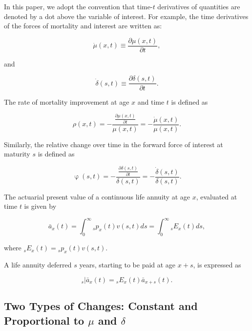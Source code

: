 \documentclass[12pt]{article}
\begin{document}
In this paper, we adopt the convention that time-$t$ derivatives of quantities are denoted by a dot above the variable of interest. For example, the time derivatives of the forces of mortality and interest are written as:


\begin{equation} \label{eq:mudot}
\dot{\mu}(x,t)\equiv\frac{\partial\mu(x,t)}{\partial t},
\end{equation}

and 

\begin{equation} \label{eq:deltadot}
\dot{\delta}(s,t)\equiv\frac{\partial\delta(s,t)}{\partial t}.
\end{equation}

The rate of mortality improvement at age \(x\) and time $t$ is defined as

\begin{equation} \label{eq:rho}
\rho(x,t)=-\frac{\frac{\partial \mu(x,t)}{\partial t}}{\mu(x,t)} = - \frac{\dot{\mu}(x,t)}{\mu(x,t)}.
\end{equation}

Similarly, the relative change over time in the forward force of interest at maturity $s$ is defined as 

\begin{equation} \label{eq:phi}
\upvarphi(s,t)=-\frac{\frac{\partial \delta(s,t)}{\partial t}}{\delta(s,t)} = -\frac{\dot{\delta}(s,t)}{\delta(s,t)}.
\end{equation}

The actuarial present value of a continuous life annuity at age $x$, evaluated at time $t$ is given by

\begin{equation}\label{eq:Annuity}
\bar{a}_x(t) = \int_0^\infty {}_sp_x(t) {v}(s,t)ds = \int_0^\infty {}_sE_x(t) ds,
\end{equation}

where ${}_sE_x(t)={}_sp_x(t) {v}(s,t)$. 

A life annuity deferred $s$ years, starting to be paid at age $x+s$, is expressed as

\begin{equation}\label{eq:DefAnnuity}
{}_s|\bar{a}_x(t) = {}_sE_x(t) \bar{a}_{x+s}(t).
\end{equation}


\subsection{Two Types of Changes: Constant and Proportional to $\mu$ and $\delta$}
\end{document}
